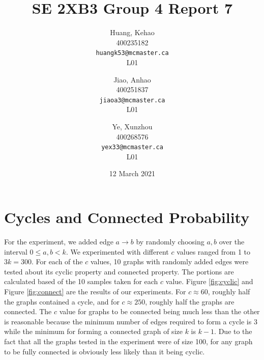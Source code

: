 \documentclass[titlepage, 12pt]{article}
\title{SE 2XB3 Group 4 Report 7}
\author{
  Huang, Kehao \\
  400235182 \\
  \texttt{huangk53@mcmaster.ca} \\
  L01
  \and
  Jiao, Anhao \\
  400251837 \\
  \texttt{jiaoa3@mcmaster.ca} \\
  L01
  \and
  Ye, Xunzhou \\
  400268576 \\
  \texttt{yex33@mcmaster.ca} \\
  L01
}
\date{12 March 2021}
\begin{document}
\maketitle{}

\newpage{}

\section{Cycles and Connected Probability}

For the experiment, we added edge \(a \rightarrow b\) by randomly choosing
\(a, b\) over the interval \(0 \leq a, b < k\). We experimented with different
\(c\) values ranged from 1 to \(3k = 300\). For each of the \(c\) values, 10
graphs with randomly added edges were tested about its cyclic property and
connected property. The portions are calculated based of the 10 samples taken
for each \(c\) value. Figure \ref{fig:cyclic} and Figure \ref{fig:connect} are
the results of our experiments. For \(c \approx 60\), roughly half the graphs
contained a cycle, and for \(c \approx 250\), roughly half the graphs are
connected. The \(c\) value for graphs to be connected being much less than the
other is reasonable because the minimum number of edges required to form a cycle
is 3 while the minimum for forming a connected graph of size \(k\) is \(k - 1\).
Due to the fact that all the graphs tested in the experiment were of size 100,
for any graph to be fully connected is obviously less likely than it being cyclic.
\end{document}
